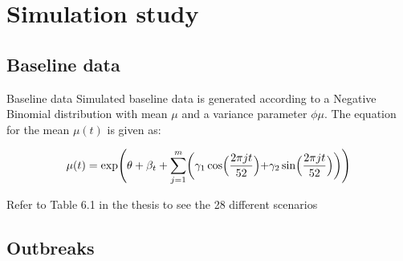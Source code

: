 \documentclass[aspectratio=169,handout]{beamer}
\begin{document}
\hypertarget{simulation-study}{%
\section{Simulation study}\label{simulation-study}}

\hypertarget{baseline-data}{%
\subsection{Baseline data}\label{baseline-data}}

\begin{frame}{Baseline data}
Simulated baseline data is generated according to a Negative Binomial
distribution with mean \(\mu\) and a variance parameter \(\phi\mu\). The
equation for the mean \(\mu(t)\) is given as:

\begin{equation}
\mu(t)=\exp\Biggl(\theta+\beta_t+\sum_{j=1}^m \biggl(\gamma_1 \cos\Bigl(\frac{2\pi jt}{52}\Bigl) + \gamma_2 \sin \Bigl(\frac{2\pi jt}{52} \Bigl)\biggl)\Biggl)
\end{equation}

\vspace{.3cm}

Refer to Table 6.1 in the thesis to see the 28 different scenarios
\end{frame}

\hypertarget{outbreaks}{%
\subsection{Outbreaks}\label{outbreaks}}
\end{document}
